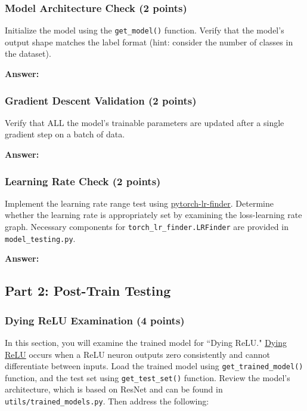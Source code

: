 \documentclass[11pt, oneside]{article}   	%
\begin{document}
\subsubsection*{Model Architecture Check (2 points)}
Initialize the model using the \texttt{get\_model()} function. Verify that the model’s output shape matches the label format (hint: consider the number of classes in the dataset).

\begin{answerbox} \textbf{Answer:} \vspace*{1cm}

\end{answerbox} 

\subsubsection*{Gradient Descent Validation (2 points)}
Verify that ALL the model's trainable parameters are updated after a single gradient step on a batch of data.

\begin{answerbox} \textbf{Answer:} \vspace*{1cm}

\end{answerbox}


\subsubsection*{Learning Rate Check (2 points)}
 Implement the learning rate range test using \href{https://github.com/davidtvs/pytorch-lr-finder#tweaked-version-from-fastaiauto}{pytorch-lr-finder}. Determine whether the learning rate is appropriately set by examining the loss-learning rate graph. Necessary components for \texttt{torch\_lr\_finder.LRFinder} are provided in \texttt{model\_testing.py}.


\begin{answerbox} \textbf{Answer:} \vspace*{1cm}

\end{answerbox}

\subsection*{Part 2: Post-Train Testing}

\subsubsection*{Dying ReLU Examination (4 points)}
In this section, you will examine the trained model for ``Dying ReLU." \href{https://datascience.stackexchange.com/questions/5706/what-is-the-dying-relu-problem-in-neural-networks}{Dying ReLU} occurs when a ReLU neuron outputs zero consistently and cannot differentiate between inputs. 
Load the trained model using \texttt{get\_trained\_model()} function, and the test set using \texttt{get\_test\_set()} function. Review the model's architecture, which is based on ResNet and can be found in \texttt{utils/trained\_models.py}. Then address the following:
\end{document}
